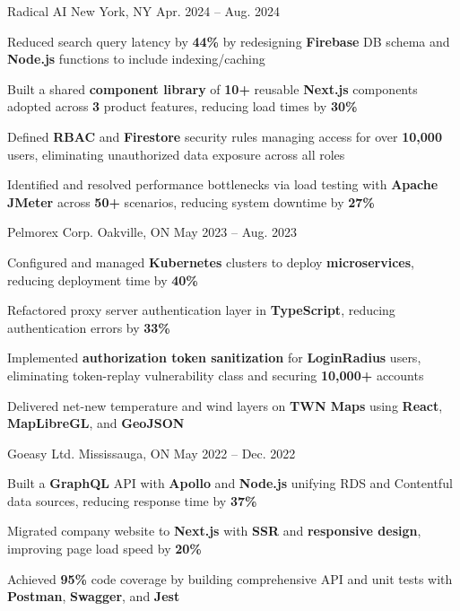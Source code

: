 \documentclass[11pt, a4paper]{awesome-cv}
\begin{document}
\begin{cventries}
  \cventry
    {\color{lightblue}{SOFTWARE ENGINEER INTERN}}
    {Radical AI}
    {New York, NY}
    {Apr. 2024 -- Aug. 2024}
    {
      \begin{cvitems}
        \item{Reduced search query latency by \textbf{44\%} by redesigning \textbf{Firebase} DB schema and \textbf{Node.js} functions to include indexing/caching}
        \item{Built a shared \textbf{component library} of \textbf{10+} reusable \textbf{Next.js} components adopted across \textbf{3} product features, reducing load times by \textbf{30\%}}
        \item{Defined \textbf{RBAC} and \textbf{Firestore} security rules managing access for over \textbf{10,000} users, eliminating unauthorized data exposure across all roles}
        \item{Identified and resolved performance bottlenecks via load testing with \textbf{Apache JMeter} across \textbf{50+} scenarios, reducing system downtime by \textbf{27\%}}
      \end{cvitems}
    }

  \cventry
    {\color{lightblue}{SOFTWARE ENGINEER INTERN}}
    {Pelmorex Corp.}
    {Oakville, ON}
    {May 2023 -- Aug. 2023}
    {
      \begin{cvitems}
        \item{Configured and managed \textbf{Kubernetes} clusters to deploy \textbf{microservices}, reducing deployment time by \textbf{40\%}}
        \item{Refactored proxy server authentication layer in \textbf{TypeScript}, reducing authentication errors by \textbf{33\%}}
        \item{Implemented \textbf{authorization token sanitization} for \textbf{LoginRadius} users, eliminating token-replay vulnerability class and securing \textbf{10,000+} accounts}
        \item{Delivered net-new temperature and wind layers on \textbf{TWN Maps} using \textbf{React}, \textbf{MapLibreGL}, and \textbf{GeoJSON}}
      \end{cvitems}
    }

  \cventry
    {\color{lightblue}{FRONT-END DEVELOPER INTERN}}
    {Goeasy Ltd.}
    {Mississauga, ON}
    {May 2022 -- Dec. 2022}
    {
      \begin{cvitems}
        \item{Built a \textbf{GraphQL} API with \textbf{Apollo} and \textbf{Node.js} unifying RDS and Contentful data sources, reducing response time by \textbf{37\%}}
        \item{Migrated company website to \textbf{Next.js} with \textbf{SSR} and \textbf{responsive design}, improving page load speed by \textbf{20\%}}
        \item{Achieved \textbf{95\%} code coverage by building comprehensive API and unit tests with \textbf{Postman}, \textbf{Swagger}, and \textbf{Jest}}
      \end{cvitems}
    }

\end{cventries}
\end{document}
